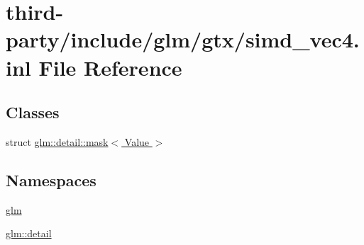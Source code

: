 \hypertarget{simd__vec4_8inl}{}\section{third-\/party/include/glm/gtx/simd\+\_\+vec4.inl File Reference}
\label{simd__vec4_8inl}
\subsection*{Classes}
\begin{DoxyCompactItemize}
\item 
struct \hyperlink{structglm_1_1detail_1_1mask}{glm\+::detail\+::mask$<$ Value $>$}
\end{DoxyCompactItemize}
\subsection*{Namespaces}
\begin{DoxyCompactItemize}
\item 
 \hyperlink{namespaceglm}{glm}
\item 
 \hyperlink{namespaceglm_1_1detail}{glm\+::detail}
\end{DoxyCompactItemize}
